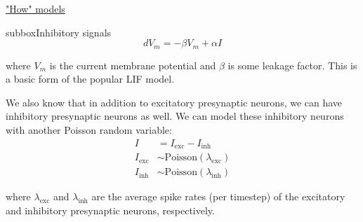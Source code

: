\begin{textbox}{\href{https://compneuro.neuromatch.io/tutorials/W1D1_ModelTypes/student/W1D1_Tutorial2.html}{"How" models } }
\begin{subbox}{subbox}{Inhibitory signals}
\begin{equation}
dV_m = -{\beta}V_m + {\alpha}I
\end{equation}

where $V_m$ is the current membrane potential and $\beta$ is some leakage factor. This is a basic form of the popular LIF model.

We also know that in addition to excitatory presynaptic neurons, we can have inhibitory presynaptic neurons as well. We can model these inhibitory neurons with another Poisson random variable:
\begin{align}
I &= I_{\mathrm{exc}} - I_{\mathrm{inh}} \\
I_{\mathrm{exc}} &\sim \mathrm{Poisson}(\lambda_{\mathrm{exc}}) \\
I_{\mathrm{inh}} &\sim \mathrm{Poisson}(\lambda_{\mathrm{inh}})
\end{align}

where $\lambda_{\mathrm{exc}}$ and $\lambda_{\mathrm{inh}}$ are the average spike rates (per timestep) of the excitatory and inhibitory presynaptic neurons, respectively.

\end{subbox}
\end{textbox}
